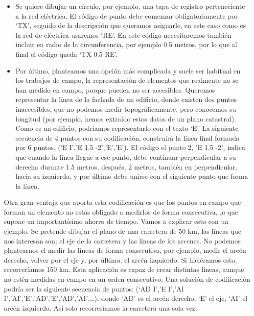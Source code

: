 \begin{itemize}
\item Se quiere dibujar un círculo, por ejemplo, una tapa de registro perteneciente a la red eléctrica.  El código de punto debe comenzar obligatoriamente por ‘TX’, seguido de la descripción que queramos asignarle, en este caso como es la red de eléctrica usaremos ‘RE’. En este código necesitaremos también incluir en radio de la circunferencia, por ejemplo 0.5 metros, por lo que al final el código queda ‘TX 0.5 RE’.

\item Por último, planteamos una opción más complicada y suele ser habitual en los trabajos de campo, la representación de elementos que realmente no se han medido en campo, porque pueden no ser accesibles. Queremos representar la línea de la fachada de un edificio, donde existen dos puntos inaccesibles, que no podemos medir topográficamente, pero conocemos su longitud (por ejemplo, hemos extraído estos datos de un plano catastral). Como es un edificio, podríamos representarlo con el texto ‘E’. La siguiente secuencia de 4 puntos con su codificación, construirá la línea final formada por 6 puntos, (‘E I’,’E 1.5 -2’,’E’,’E’). El código el punto 2, ’E 1.5 -2’, indica que cuando la línea llegue a ese punto, debe continuar perpendicular a su derecha durante 1.5 metros, después, 2 metros, también en perpendicular, hacia su izquierda, y por último debe unirse con el siguiente punto que forma la línea. 

\end{itemize}

Otra gran ventaja que aporta esta codificación es que los puntos en campo que forman un elemento no estás obligado a medirlos de forma consecutiva, lo que supone un importantísimo ahorro de tiempo. Vamos a explicar esto con un ejemplo. Se pretende dibujar el plano de una carretera de 50 km, las líneas que nos interesan son; el eje de la carretera y las líneas de los arcenes. No podemos plantearnos el medir las líneas de forma consecutiva, por ejemplo, medir el arcén derecho, volver por el eje y, por último, el arcén izquierdo. Si hiciéramos esto, recorreríamos 150 km. Esta aplicación es capaz de crear distintas líneas, aunque no estén medidas en campo en un orden consecutivo. Una solución de codificación podría ser la siguiente secuencia de puntos: (‘AD I’,’E I’,’AI I’,’AI’,’E’,’AD’,’E’,’AD’,’AI’,…), donde ‘AD’ es el arcén derecho, ‘E’ el eje, ‘AI’ el arcén izquierdo. Así solo recorreríamos la carretera una sola vez. 

